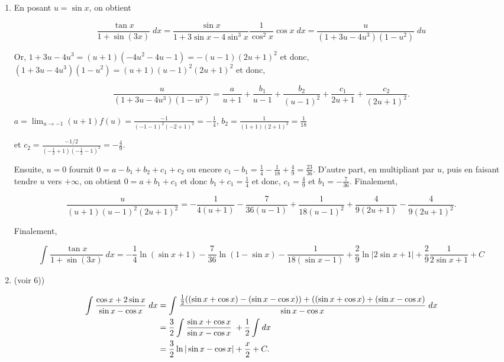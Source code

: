 {{\begin{enumerate}
et donc,

$$\int_{}^{}\frac{\sin x\sin(2x)}{\sin^4x+\cos^4x+1}\;dx=\frac{1}{4\sqrt{3}}\ln\left|
\frac{\sin^2x-\sqrt{3}\sin x+1}{\sin^2x+\sqrt{3}\sin x+1}\right|+\frac{1}{2}(\Arctan(2\sin x-\sqrt{3})+\Arctan(2\sin x+\sqrt{3})+C.$$

\item  En posant $u=\sin x$, on obtient 

$$\frac{\tan x}{1+\sin(3x)}\;dx=\frac{\sin x}{1+3\sin x-4\sin^3x}\frac{1}{\cos^2x}\cos x\;dx=\frac{u}{(1+3u-4u^3)(1-u^2)}\;du$$

Or, $1+3u-4u^3=(u+1)(-4u^2-4u-1)=-(u-1)(2u+1)^2$ et donc, $(1+3u-4u^3)(1-u^2)=(u+1)(u-1)^2(2u+1)^2$ et donc,

$$\frac{u}{(1+3u-4u^3)(1-u^2)}=\frac{a}{u+1}+\frac{b_1}{u-1}+\frac{b_2}{(u-1)^2}+\frac{c_1}{2u+1}+\frac{c_2}{(2u+1)^2}.$$

$a=\lim_{u\rightarrow -1}(u+1)f(u)=\frac{-1}{(-1-1)^2(-2+1)^2}=-\frac{1}{4}$, $b_2=\frac{1}{(1+1)(2+1)^2}=\frac{1}{18}$

et $c_2=\frac{-1/2}{(-\frac{1}{2}+1)(-\frac{1}{2}-1)^2}=-\frac{4}{9}$.

Ensuite, $u=0$ fournit $0=a-b_1+b_2+c_1+c_2$ ou encore $c_1-b_1=\frac{1}{4}-\frac{1}{18}+\frac{4}{9}=\frac{23}{36}$. D'autre part, en multipliant par $u$, puis en faisant tendre $u$ vers $+\infty$, on obtient $0=a+b_1+c_1$ et donc $b_1+c_1=\frac{1}{4}$ et donc, $c_1=\frac{4}{9}$ et $b_1=-\frac{7}{36}$. Finalement,

$$\frac{u}{(u+1)(u-1)^2(2u+1)^2}=-\frac{1}{4(u+1)}-\frac{7}{36(u-1)}+\frac{1}{18(u-1)^2}+\frac{4}{9(2u+1)}-\frac{4}{9(2u+1)^2}.$$

Finalement,

$$\int_{}^{}\frac{\tan x}{1+\sin(3x)}\;dx=-\frac{1}{4}\ln(\sin x+1)-\frac{7}{36}\ln(1-\sin x)-\frac{1}{18(\sin x-1)}+\frac{2}{9}\ln|2\sin x+1|+\frac{2}{9}\frac{1}{2\sin x+1}+C$$

\item  (voir 6)) 

\begin{align*}\ensuremath
\int_{}^{}\frac{\cos x+2\sin x}{\sin x-\cos x}\;dx&=\int_{}^{}\frac{\frac{1}{2}((\sin x+\cos x)-(\sin x-\cos x))+((\sin x+\cos x)+(\sin x-\cos x)}{\sin x-\cos x}\;dx\\
 &=\frac{3}{2}\int_{}^{}\frac{\sin x+\cos x}{\sin x-\cos x}\;+\frac{1}{2}\int_{}^{}dx\\
 &=\frac{3}{2}\ln|\sin x-\cos x|+\frac{x}{2}+C.
\end{align*}


\end{enumerate}}}
